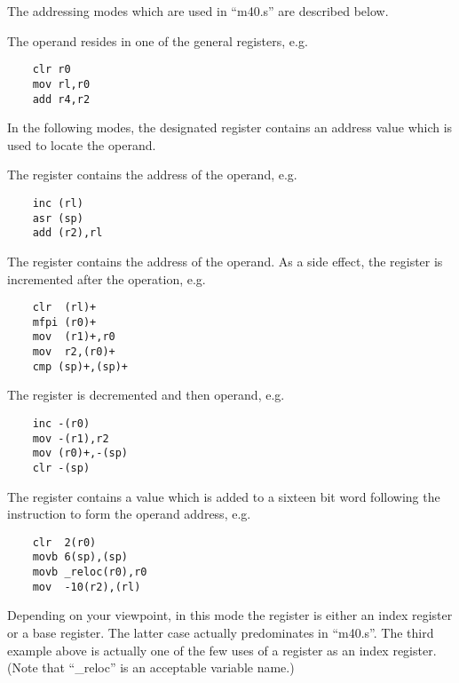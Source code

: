 The addressing modes which are used in
``m40.s'' are described below.

\bd
\item[Register Mode:] The operand resides in
one of the general registers, e.g.

\begin{verbatim}
    clr r0
    mov rl,r0
    add r4,r2
\end{verbatim}


In the following modes, the designated
register contains an address value
which is used to locate the operand.

\item[Register Deferred Mode:] The register
contains the address of the operand,
e.g.

\begin{verbatim}
    inc (rl)
    asr (sp)
    add (r2),rl
\end{verbatim}

\item[Autoincrement Mode:] The register contains
the address of the operand. As a
side effect, the register is incremented
after the operation, e.g.

\begin{verbatim}
    clr  (rl)+
    mfpi (r0)+
    mov  (r1)+,r0
    mov  r2,(r0)+
    cmp (sp)+,(sp)+
\end{verbatim}

\item[Autodecrement Mode:] The register is
decremented and then 
operand, e.g.

\begin{verbatim}
    inc -(r0)
    mov -(r1),r2
    mov (r0)+,-(sp)
    clr -(sp)
\end{verbatim}

\item[Index Mode:] The register contains a
value which is added to a sixteen bit
word following the instruction to form
the operand address, e.g.

\begin{verbatim}
    clr  2(r0)
    movb 6(sp),(sp)
    movb _reloc(r0),r0
    mov  -10(r2),(rl)
\end{verbatim}

Depending on your viewpoint, in this
mode the register is either an index
register or a base register. The
latter case actually predominates in
``m40.s''. The third example above is
actually one of the few uses of a
register as an index register. (Note
that ``\_reloc'' is an acceptable variable
name.)

